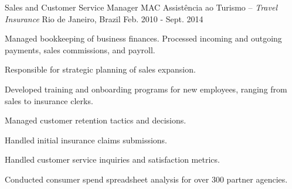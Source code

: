 \begin{cventries}

\cventry
{Sales and Customer Service Manager} %
{MAC Assistência ao Turismo \textmd{-- \em{Travel Insurance}}} %
{Rio de Janeiro, Brazil} %
{Feb. 2010 - Sept. 2014} %
{ %
\begin{cvitems}
\item {Managed bookkeeping of business finances. Processed incoming and outgoing payments, sales commissions, and payroll.}
\item {Responsible for strategic planning of sales expansion.}
\item {Developed training and onboarding programs for new employees, ranging from sales to insurance clerks.}
\item {Managed customer retention tactics and decisions.}
\item {Handled initial insurance claims submissions.}
\item {Handled customer service inquiries and satisfaction metrics.}
\item {Conducted consumer spend spreadsheet analysis for over 300 partner agencies.}
\end{cvitems}
}



\end{cventries}